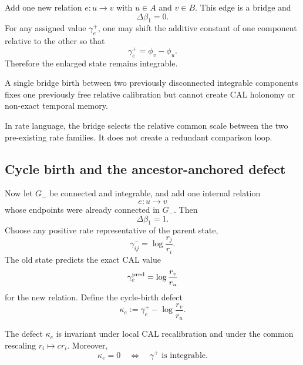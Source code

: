 Add one new relation $e:u\to v$ with $u\in A$ and $v\in B$. This edge is a bridge and
\begin{equation}
\Delta\beta_1=0.
\end{equation}
For any assigned value $\gamma^+_e$, one may shift the additive constant of one component relative to the other so that
\begin{equation}
\gamma^+_e=\phi_v-\phi_u.
\end{equation}
Therefore the enlarged state remains integrable.

\begin{proposition}
\label{prop:bridge-birth}
A single bridge birth between two previously disconnected integrable components fixes one previously free relative calibration but cannot create CAL holonomy or non-exact temporal memory.
\end{proposition}

In rate language, the bridge selects the relative common scale between the two pre-existing rate families. It does not create a redundant comparison loop.

\subsection{Cycle birth and the ancestor-anchored defect}

Now let $G_-$ be connected and integrable, and add one internal relation
\begin{equation}
e:u\to v
\end{equation}
whose endpoints were already connected in $G_-$. Then
\begin{equation}
\Delta\beta_1=1.
\end{equation}
Choose any positive rate representative of the parent state,
\begin{equation}
\gamma^-_{ij}=\log\frac{r_j}{r_i}.
\end{equation}
The old state predicts the exact CAL value
\begin{equation}
\gamma^{\rm pred}_e
=\log\frac{r_v}{r_u}
\end{equation}
for the new relation. Define the cycle-birth defect
\begin{equation}
\boxed{
\kappa_e
:=
\gamma^+_e-\log\frac{r_v}{r_u}
}.
\label{eq:kappa-single}
\end{equation}

\begin{proposition}
\label{prop:kappa-gauge}
The defect $\kappa_e$ is invariant under local CAL recalibration and under the common rescaling $r_i\mapsto c r_i$. Moreover,
\begin{equation}
\kappa_e=0
\quad\Longleftrightarrow\quad
\gamma^+\text{ is integrable}.
\label{eq:kappa-integrability}
\end{equation}
\end{proposition}

